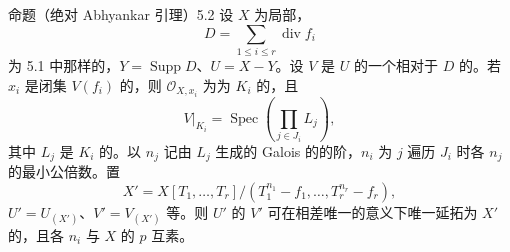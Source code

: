 \begin{SGAresult}{命题（绝对 Abhyankar 引理）}{5.2}
设 $X$ 为局部，
\[D=\sum_{1\leq i\leq r}\operatorname{div}f_i\]
为 5.1 中那样的，$Y=\operatorname{Supp}D$、$U=X-Y$。设 $V$ 是 $U$ 的一个相对于 $D$ 的。若 $x_i$ 是闭集 $V(f_i)$ 的，则 $\mathcal O_{X,x_i}$ 为为 $K_i$ 的，且
\[V|_{K_i}=\operatorname{Spec}\left(\prod_{j\in J_i}L_j\right),\]
其中 $L_j$ 是 $K_i$ 的。以 $n_j$ 记由 $L_j$ 生成的 Galois 的的阶，$n_i$ 为 $j$ 遍历 $J_i$ 时各 $n_j$ 的最小公倍数。置
\[X'=X[T_1,\ldots,T_r]/(T_1^{n_1}-f_1,\ldots,T_r^{n_r}-f_r),\]
$U'=U_{(X')}$、$V'=V_{(X')}$ 等。则 $U'$ 的 $V'$ 可在相差唯一的意义下唯一延拓为 $X'$ 的，且各 $n_i$ 与 $X$ 的 $p$ 互素。
\end{SGAresult}
